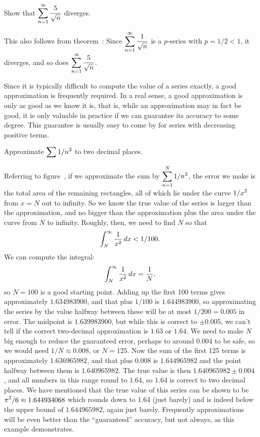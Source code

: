 \example Show that $\displaystyle\sum_{n=1}^\infty {5\over \sqrt{n}}$ diverges.
\par\nobreak\ssk\noindent This also follows from
theorem~: Since $\displaystyle\sum_{n=1}^\infty
{1\over \sqrt{n}}$ is a $p$-series with $p=1/2<1$, it diverges, and so
does $\displaystyle\sum_{n=1}^\infty {5\over \sqrt{n}}$.  
\endexample

Since it is typically difficult to compute the value of a series
exactly, a good approximation is frequently required. In a real sense,
a good approximation is only as good as we know it is, that is, while
an approximation may in fact be good, it is only valuable in practice
if we can guarantee its accuracy to some degree. This guarantee is
usually easy to come by for series with decreasing positive terms.

\example Approximate $\displaystyle \sum 1/n^2$ to two decimal places.

Referring to figure~,
if we approximate the sum by $\displaystyle \sum_{n=1}^N 1/n^2$, the error we make is the
total area of the remaining rectangles, all of which lie under the
curve $\displaystyle 1/x^2$ from $x=N$ out to infinity. So we know the true value of
the series is larger than the approximation, and no bigger than the
approximation plus the area under the curve from $N$ to
infinity. Roughly, then, we need to find $N$ so that 
$$\int_N^\infty {1\over x^2}\,dx < 1/100.$$
We can compute the integral:
$$\int_N^\infty {1\over x^2}\,dx = {1\over N},$$ 
so $N=100$ is a good starting point.  Adding up the first 100 terms
gives approximately $1.634983900$, and that plus $1/100$ is
$1.644983900$, so approximating the series by the value halfway
between these will be at most $1/200=0.005$ in error.  The midpoint is
$1.639983900$, but while this is correct to $\pm0.005$, we can't tell
if the correct two-decimal approximation is $1.63$ or $1.64$. We need
to make $N$ big enough to reduce the guaranteed error, perhaps to
around $0.004$ to be safe, so we would need $1/N\approx 0.008$, or
$N=125$. Now the sum of the first 125 terms is approximately
$1.636965982$, and that plus $0.008$ is $1.644965982$ and the point
halfway between them is $1.640965982$. The true value is then
$1.640965982\pm 0.004$, and all numbers in this range round to $1.64$,
so $1.64$ is correct to two decimal places. We have mentioned that
the true value of this series can be shown to be $\displaystyle
\pi^2/6\approx1.644934068$ which rounds down to $1.64$ (just barely)
and is indeed below the upper bound of $1.644965982$, again just
barely. Frequently approximations will be even better than the
``guaranteed'' accuracy, but not always, as this example demonstrates.
\endexample

